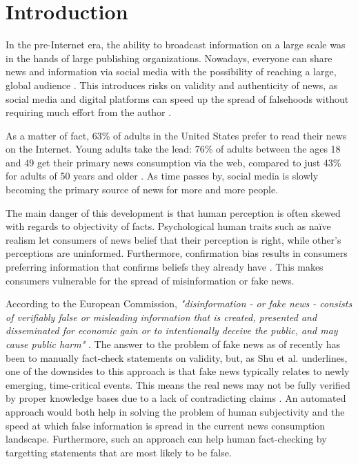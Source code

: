 \section{Introduction}
In the pre-Internet era, the ability to broadcast information on a large scale was in the hands of large publishing organizations. 
Nowadays, everyone can share news and information via social media with the possibility of reaching a large, global audience \cite{howell2013}. 
This introduces risks on validity and authenticity of news, as social media and digital platforms can speed up the spread of falsehoods without requiring much effort from the author \cite{europeancommission2018}. 

As a matter of fact, 63\% of adults in the United States prefer to read their news on the Internet. 
Young adults take the lead: 76\% of adults between the ages 18 and 49 get their primary news consumption via the web, compared to just 43\% for adults of 50 years and older \cite{mitchell2018}.
As time passes by, social media is slowly becoming the primary source of news for more and more people. 

The main danger of this development is that human perception is often skewed with regards to objectivity of facts. 
Psychological human traits such as naïve realism let consumers of news belief that their perception is right, while other's perceptions are uninformed. 
Furthermore, confirmation bias results in consumers preferring information that confirms beliefs they already have \cite{shu2017}. 
This makes consumers vulnerable for the spread of misinformation or fake news. 

According to the European Commission, \textit{"disinformation - or fake news - consists of verifiably false or misleading information that is created, presented and disseminated for economic gain or to intentionally deceive the public, and may cause public harm"} \cite{europeancommission2018}. 
The answer to the problem of fake news as of recently has been to manually fact-check statements on validity, but, as Shu et al. underlines, one of the downsides to this approach is that fake news typically relates to newly emerging, time-critical events. 
This means the real news may not be fully verified by proper knowledge bases due to a lack of contradicting claims \cite{shu2017}. 
An automated approach would both help in solving the problem of human subjectivity and the speed at which false information is spread in the current news consumption landscape.
Furthermore, such an approach can help human fact-checking by targetting statements that are most likely to be false.

